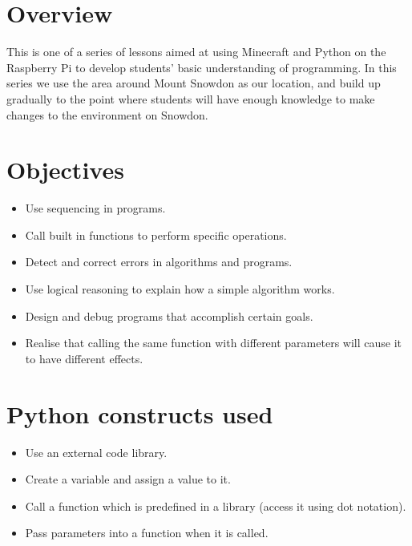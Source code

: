 \documentclass{geocraft-lesson-plan}
\begin{document}
\subtitle{Part 1 - Sequencing}

\section*{Overview} This is one of a series of lessons aimed at using Minecraft and Python on the Raspberry Pi to
develop students’ basic understanding of programming. In this series we use the area around Mount Snowdon as our
location, and build up gradually to the point where students will have enough knowledge to make changes to the
environment on Snowdon.  

\section*{Objectives}
\begin{itemize}
\item Use sequencing in programs.
\item Call built in functions to perform specific operations.
\item Detect and correct errors in algorithms and programs.
\item Use logical reasoning to explain how a simple algorithm works. 
\item Design and debug programs that accomplish certain goals.
\item Realise that calling the same function with different parameters will cause it to have different effects. 
\end{itemize}

\section*{Python constructs used}
\begin{itemize}
\item Use an external code library.
\item Create a variable and assign a value to it.
\item Call a function which is predefined in a library (access it using dot notation).
\item Pass parameters into a function when it is called.
\end{itemize}
\end{document}
